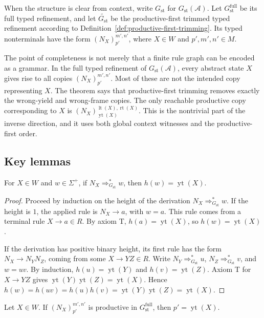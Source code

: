 \documentclass[sub]{jalc}
\newcommand{\yt}{\operatorname{yt}}
\newcommand{\lt}{\operatorname{lt}}
\newcommand{\rt}{\operatorname{rt}}
\begin{document}
When the structure is clear from context, write \(G_{\mathrm{st}}\) for \(G_{\mathrm{st}}(\mathcal A)\). Let \(G_{\mathrm{st}}^{\mathrm{full}}\) be its full typed refinement, and let \(\widetilde{G_{\mathrm{st}}}\) be the productive-first trimmed typed refinement according to Definition~\ref{def:productive-first-trimming}. Its typed nonterminals have the form \((N_X)_{p'}^{m',n'}\), where \(X\in W\) and \(p',m',n'\in M\).

The point of completeness is not merely that a finite rule graph can be encoded as a grammar. In the full typed refinement of \(G_{\mathrm{st}}(\mathcal A)\), every abstract state \(X\) gives rise to all copies \((N_X)_{p'}^{m',n'}\). Most of these are not the intended copy representing \(X\). The theorem says that productive-first trimming removes exactly the wrong-yield and wrong-frame copies. The only reachable productive copy corresponding to \(X\) is \((N_X)_{\yt(X)}^{\lt(X),\rt(X)}\). This is the nontrivial part of the inverse direction, and it uses both global context witnesses and the productive-first order.

\subsection{Key lemmas}
\label{subsec:key-lemmas}

\begin{lemma}
\label{lem:state-yield-invariant}
For \(X\in W\) and \(w\in\Sigma^+\), if \(N_X\Rightarrow_{G_{\mathrm{st}}}^* w\), then \(h(w)=\yt(X)\).
\end{lemma}

\begin{proof}
Proceed by induction on the height of the derivation \(N_X\Rightarrow_{G_{\mathrm{st}}}^* w\). If the height is \(1\), the applied rule is \(N_X\to a\), with \(w=a\). This rule comes from a terminal rule \(X\to a\in R\). By axiom T, \(h(a)=\yt(X)\), so \(h(w)=\yt(X)\).

If the derivation has positive binary height, its first rule has the form \(N_X\to N_YN_Z\), coming from some \(X\to YZ\in R\). Write \(N_Y\Rightarrow_{G_{\mathrm{st}}}^*u\), \(N_Z\Rightarrow_{G_{\mathrm{st}}}^*v\), and \(w=uv\). By induction, \(h(u)=\yt(Y)\) and \(h(v)=\yt(Z)\). Axiom T for \(X\to YZ\) gives \(\yt(Y)\yt(Z)=\yt(X)\). Hence \(h(w)=h(uv)=h(u)h(v)=\yt(Y)\yt(Z)=\yt(X)\).
\end{proof}

\begin{lemma}
\label{lem:productive-copy-correct-yield}
Let \(X\in W\). If \((N_X)_{p'}^{m',n'}\) is productive in \(G_{\mathrm{st}}^{\mathrm{full}}\), then \(p'=\yt(X)\).
\end{lemma}
\end{document}
